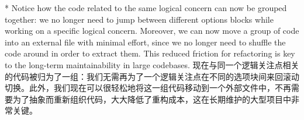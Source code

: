 \begin{paracol}{2} 
 
\switchcolumn[0]*%
Notice how the code related to the same logical concern can now be
grouped together: we no longer need to jump between different options
blocks while working on a specific logical concern. Moreover, we can now
move a group of code into an external file with minimal effort, since we
no longer need to shuffle the code around in order to extract them. This
reduced friction for refactoring is key to the long-term maintainability
in large codebases.
\switchcolumn
现在与同一个逻辑关注点相关的代码被归为了一组：我们无需再为了一个逻辑关注点在不同的选项块间来回滚动切换。此外，我们现在可以很轻松地将这一组代码移动到一个外部文件中，不再需要为了抽象而重新组织代码，大大降低了重构成本，这在长期维护的大型项目中非常关键。 
\end{paracol}



